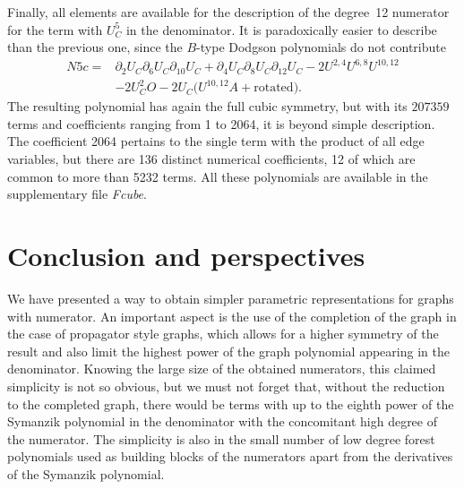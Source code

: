\documentclass[pdftex]{sigma}
\numberwithin{equation}{section}
\begin{document}
Finally, all elements are available for the description of the degree~12 numerator for the term with $U_C^5$ in the
denominator. It is paradoxically easier to describe than the previous one, since the $B$-type Dodgson polynomials do not
contribute
\begin{align*}
	N5c ={}& \partial_2U_C \partial_6U_C \partial_{10}U_C
	+ \partial_4U_C \partial_8U_C \partial_{12}U_C -2 U^{2,4}U^{6,8}U^{10,12} \\
	& - 2 U_C^2 O - 2 U_C \bigl( U^{10,12} A + \mbox{rotated} \bigr).
\end{align*}
The resulting polynomial has again the full cubic symmetry, but with its $207 359$ terms and coefficients ranging from 1 to
2064, it is beyond simple description. The coefficient 2064 pertains to the single term with the product of all edge
variables, but there are 136 distinct numerical coefficients, 12 of which are common to more than 5232 terms. All these
polynomials are available in the supplementary file \emph{Fcube}.

\section{Conclusion and perspectives}
We have presented a way to obtain simpler parametric representations for graphs with numerator. An important aspect is the
use of the completion of the graph in the case of propagator style graphs, which allows for a higher symmetry of the result
and also limit the highest power of the graph polynomial appearing in the denominator. Knowing the large size of the
obtained numerators, this
claimed simplicity is not so obvious, but we must not forget that, without the reduction to the completed graph, there
would be terms with up to the eighth power of the Symanzik polynomial in the denominator with the concomitant high degree
of the numerator. The simplicity is also in the small number of low degree forest polynomials used as building blocks of
the numerators apart from the derivatives of the Symanzik polynomial.
\end{document}
